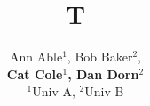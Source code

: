 \documentclass{article}
\begin{document}
\title{T}
\author{Ann Able$^{1}$, Bob Baker$^{2}$, \\
\vspace{-1.0em}\textbf{Cat Cole$^{1}$, Dan Dorn$^{2}$}\\
$^1$Univ A, $^2$Univ B}
\maketitle
\end{document}

